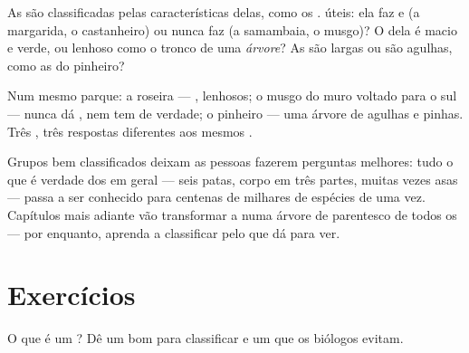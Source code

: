 \begin{proposition}\label{prop:g3:sorting-living-things:plants}
As  são classificadas pelas características delas, como os
.  úteis: ela faz \emph{} e  (a
margarida, o castanheiro) ou nunca faz (a samambaia, o musgo)? O
 dela é macio e verde, ou lenhoso como o tronco de uma
\emph{árvore}? As  são largas ou são agulhas, como as do
pinheiro?
\end{proposition}
\admitted

\begin{example}\label{ex:g3:sorting-living-things:park}
Num mesmo parque: a roseira --- ,  lenhosos; o musgo do
muro voltado para o sul --- nunca dá , nem tem  de
verdade; o pinheiro --- uma árvore de agulhas e pinhas. Três
, três respostas diferentes aos mesmos .
\end{example}

\begin{remark}\label{rem:g3:sorting-living-things:science}
Grupos bem classificados deixam as pessoas fazerem perguntas
melhores: tudo o que é verdade dos  em geral --- seis patas,
corpo em três partes, muitas vezes asas --- passa a ser conhecido
para centenas de milhares de espécies de uma vez. Capítulos mais
adiante vão transformar a  numa árvore de parentesco de
todos os  --- por enquanto, aprenda a classificar pelo
que dá para ver.
\end{remark}

\section{Exercícios}

\begin{exercise}[$\star$]\label{exo:g3:sorting-living-things:1}
O que é um ? Dê um bom  para classificar  e
um que os biólogos evitam.
\end{exercise}

